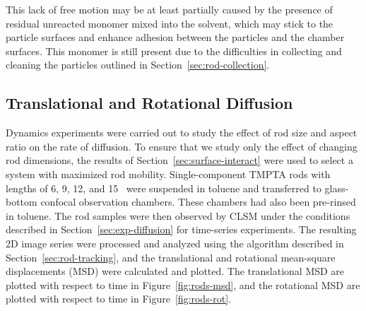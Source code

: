 This lack of free motion may be at least partially caused by the presence of residual unreacted monomer 
mixed into the solvent, which may stick to the particle surfaces and enhance adhesion between the
particles and the chamber surfaces.  This monomer is still present due to the difficulties in 
collecting and cleaning the particles outlined in Section~\ref{sec:rod-collection}.

\subsection{Translational and Rotational Diffusion}
\label{sec:rod-diffusion-results}




Dynamics experiments were carried out to study the effect of rod size and aspect ratio on the rate of
diffusion.  To ensure that we study only the effect of changing
rod dimensions, the results of Section~\ref{sec:surface-interact}
were used to select a system with maximized rod mobility. Single-component TMPTA 
rods with lengths of 6, 9, 12, and 15 \microns~were suspended in toluene and transferred 
to glass-bottom confocal observation chambers. These chambers had 
also been
pre-rinsed in toluene.  The rod samples were then observed by CLSM under the conditions described in 
Section~\ref{sec:exp-diffusion} for time-series experiments.  The resulting 2D image series were 
processed and analyzed using the algorithm described in Section~\ref{sec:rod-tracking}, and 
the translational and rotational mean-square displacements (MSD) were calculated and plotted.
The translational MSD are plotted with respect to time in Figure~\ref{fig:rods-msd}, and the 
rotational MSD are plotted with respect to time in Figure~\ref{fig:rods-rot}.

